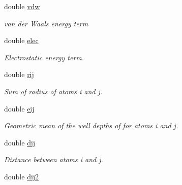 \begin{DoxyCompactItemize}
\item 
\hypertarget{classENERGY_aa7420595950a201734ce22f12782922e}{
double \hyperlink{classENERGY_aa7420595950a201734ce22f12782922e}{vdw}}
\label{classENERGY_aa7420595950a201734ce22f12782922e}

\begin{DoxyCompactList}\small\item\em van der Waals energy term \item\end{DoxyCompactList}\item 
\hypertarget{classENERGY_ad25b424448ea4a4f222978b1dfa26b91}{
double \hyperlink{classENERGY_ad25b424448ea4a4f222978b1dfa26b91}{elec}}
\label{classENERGY_ad25b424448ea4a4f222978b1dfa26b91}

\begin{DoxyCompactList}\small\item\em Electrostatic energy term. \item\end{DoxyCompactList}\item 
\hypertarget{classENERGY_addcc3639162bd515a0ba20e9c702371d}{
double \hyperlink{classENERGY_addcc3639162bd515a0ba20e9c702371d}{rij}}
\label{classENERGY_addcc3639162bd515a0ba20e9c702371d}

\begin{DoxyCompactList}\small\item\em Sum of radius of atoms i and j. \item\end{DoxyCompactList}\item 
\hypertarget{classENERGY_a8d63c0a9c6762c78e2445e5f0970b688}{
double \hyperlink{classENERGY_a8d63c0a9c6762c78e2445e5f0970b688}{eij}}
\label{classENERGY_a8d63c0a9c6762c78e2445e5f0970b688}

\begin{DoxyCompactList}\small\item\em Geometric mean of the well depths of for atoms i and j. \item\end{DoxyCompactList}\item 
\hypertarget{classENERGY_ade8b46bccae17da31618ce1e6a0c231c}{
double \hyperlink{classENERGY_ade8b46bccae17da31618ce1e6a0c231c}{dij}}
\label{classENERGY_ade8b46bccae17da31618ce1e6a0c231c}

\begin{DoxyCompactList}\small\item\em Distance between atoms i and j. \item\end{DoxyCompactList}\item 
\hypertarget{classENERGY_a29efa4e802eaaaf9d74295fadea4f2f7}{
double \hyperlink{classENERGY_a29efa4e802eaaaf9d74295fadea4f2f7}{dij2}}
\label{classENERGY_a29efa4e802eaaaf9d74295fadea4f2f7}


\end{DoxyCompactItemize}
